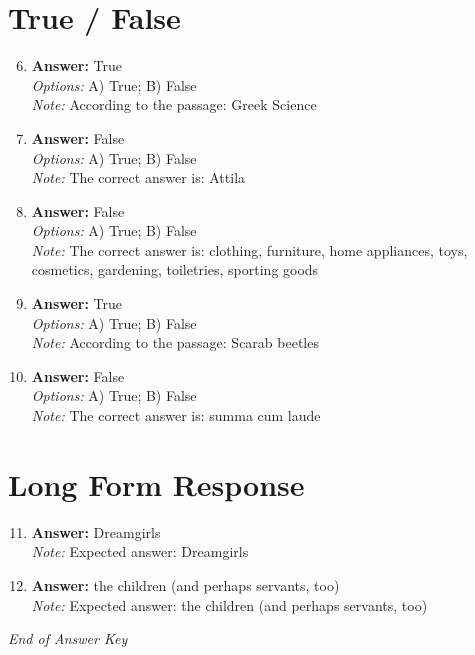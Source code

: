 \documentclass[12pt]{article}
\begin{document}
\section*{True / False}
\begin{enumerate}[label=\arabic*.]
\setcounter{enumi}{5}
\item \textbf{Answer:} True
\\ \textit{Options:} A) True; B) False
\\ \textit{Note:} According to the passage: Greek Science
\item \textbf{Answer:} False
\\ \textit{Options:} A) True; B) False
\\ \textit{Note:} The correct answer is: Attila
\item \textbf{Answer:} False
\\ \textit{Options:} A) True; B) False
\\ \textit{Note:} The correct answer is: clothing, furniture, home appliances, toys, cosmetics, gardening, toiletries, sporting goods
\item \textbf{Answer:} True
\\ \textit{Options:} A) True; B) False
\\ \textit{Note:} According to the passage: Scarab beetles
\item \textbf{Answer:} False
\\ \textit{Options:} A) True; B) False
\\ \textit{Note:} The correct answer is: summa cum laude
\end{enumerate}

\section*{Long Form Response}
\begin{enumerate}[label=\arabic*.]
\setcounter{enumi}{10}
\item \textbf{Answer:} Dreamgirls
\\ \textit{Note:} Expected answer: Dreamgirls
\item \textbf{Answer:} the children (and perhaps servants, too)
\\ \textit{Note:} Expected answer: the children (and perhaps servants, too)
\end{enumerate}

\vfill
\noindent\textit{End of Answer Key}
\end{document}
